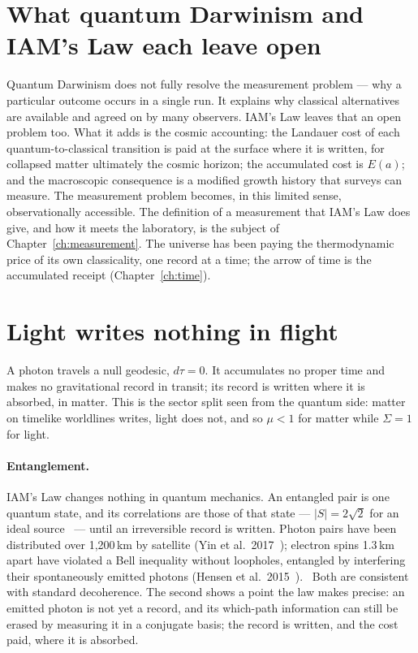 \section{What quantum Darwinism and IAM's Law each leave open}\label{sec:qr_open}
Quantum Darwinism does not fully resolve the measurement problem --- why a particular outcome occurs in a single run. It explains why classical
alternatives are available and agreed on by many observers. IAM's Law leaves that an open problem too. What it adds is the cosmic accounting: the Landauer
cost of each quantum-to-classical transition is paid at the surface where it is written, for collapsed matter ultimately the cosmic horizon; the
accumulated cost is $E(a)$; and the macroscopic consequence is a modified growth history that surveys can measure. The measurement problem becomes, in
this limited sense, observationally accessible. \interp{} The definition of a measurement that IAM's Law does give, and how it meets the laboratory, is
the subject of Chapter~\ref{ch:measurement}. The universe has been paying the thermodynamic price of its own classicality, one record at a time; the
arrow of time is the accumulated receipt (Chapter~\ref{ch:time}). \interp

\section{Light writes nothing in flight}
A photon travels a null geodesic, $d\tau=0$. It accumulates no proper time and makes no gravitational record in transit; its record is written where it
is absorbed, in matter. This is the sector split seen from the quantum side: matter on timelike worldlines writes, light does not, and so $\mu<1$ for
matter while $\Sigma=1$ for light. \derived

\paragraph{Entanglement.} IAM's Law changes nothing in quantum mechanics. An entangled pair is one quantum state, and its correlations are those of that
state --- $|S|=2\sqrt2$ for an ideal source~\cite{Tsirelson1980} --- until an irreversible record is written. Photon pairs have been distributed over 1,200\,km by satellite
(Yin et al.\ 2017~\cite{Yin2017}); electron spins 1.3\,km apart have violated a Bell inequality without loopholes, entangled by interfering their spontaneously emitted
photons (Hensen et al.\ 2015~\cite{Hensen2015}). \observed\ Both are consistent with standard decoherence. The second shows a point the law makes precise: an emitted photon is not yet
a record, and its which-path information can still be erased by measuring it in a conjugate basis; the record is written, and the cost paid, where it is
absorbed. \interp

